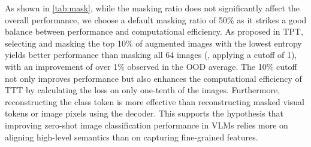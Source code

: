 As shown in \cref{tab:mask}, while the masking ratio does not significantly affect the overall performance, we choose a default masking ratio of 50\% as it strikes a good balance between performance and computational efficiency.
As proposed in TPT, selecting and masking the top 10\% of augmented images with the lowest entropy yields better performance than masking all 64 images (\ie, applying a cutoff of 1), with an improvement of over 1\% observed in the OOD average.
The 10\% cutoff not only improves performance but also enhances the computational efficiency of TTT by calculating the loss on only one-tenth of the images.
Furthermore, reconstructing the class token is more effective than reconstructing masked visual tokens or image pixels using the decoder.
This supports the hypothesis that improving zero-shot image classification performance in VLMs relies more on aligning high-level semantics than on capturing fine-grained features.


